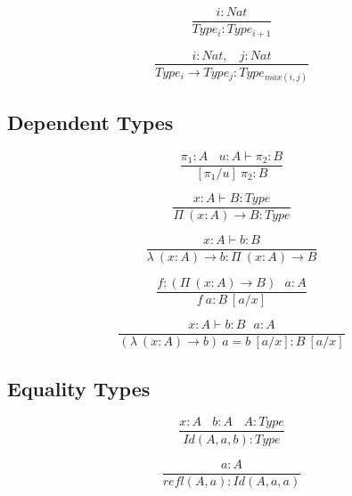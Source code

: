\documentclass[11pt,oneside]{article}
\begin{document}
\begin{equation}
\tag{axioms}
\dfrac
  {i: Nat}
  {Type_i : Type_{i+1}}
\end{equation}

\begin{equation}
\tag{rules}
\dfrac
  {i : Nat,\ \ \ \ j : Nat}
  {Type_i \rightarrow Type_{j} : Type_{max(i,j)}}
\end{equation}

  \subsection{Dependent Types}

\begin{equation}
\tag{subst}
\dfrac
  {\pi_1 : A\ \ \ \ u:A \vdash \pi_2 : B}
  {[\pi_1/u]\ \pi_2 : B}
\end{equation}

\begin{equation}
\tag{$\Pi$-formation}
\dfrac
  {x:A \vdash B : Type}
  {\Pi\ (x:A) \rightarrow B : Type}
\end{equation}

\begin{equation}
\tag{$\lambda$-intro}
\dfrac
  {x:A \vdash b : B}
  {\lambda\ (x:A) \rightarrow b : \Pi\ (x: A) \rightarrow B }
\end{equation}

\begin{equation}
\tag{$App$-elimination}
\dfrac
  {f: (\Pi\ (x:A) \rightarrow B)\ \ \ a: A}
  {f\ a : B\ [a/x]}
\end{equation}

\begin{equation}
\tag{$\beta$-computation}
\dfrac
  {x:A \vdash b: B\ \ \ a:A}
  {(\lambda\ (x:A) \rightarrow b)\ a = b\ [a/x] : B\ [a/x]}
\end{equation}

\newpage
  \subsection{Equality Types}

\begin{equation}
\tag{$Id$-formation}
\dfrac
  {x:A\ \ \ \ b:A\ \ \ \ A:Type}
  {Id(A,a,b) : Type}
\end{equation}

\begin{equation}
\tag{$Id$-intro}
\dfrac
  {a:A}
  {refl(A,a) : Id(A,a,a) }
\end{equation}
\end{document}
